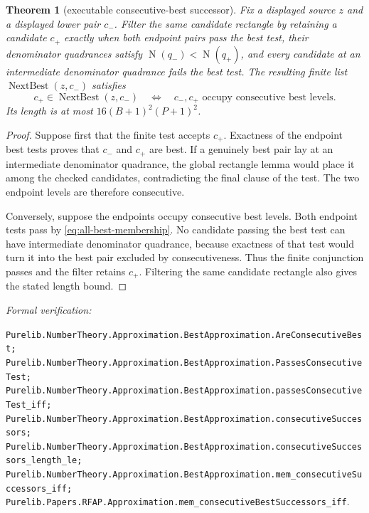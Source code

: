 \documentclass[11pt]{article}
\newtheorem{theorem}{Theorem}[section]
\newcommand{\Norm}[1]{\operatorname{N}\!\left(#1\right)}
\newcommand{\leanref}[1]{\par\smallskip\noindent
  \emph{Formal verification:}\par\nobreak
  {\raggedright\nolinkurl{#1}.\par}}
\begin{document}
\begin{theorem}[executable consecutive-best successor]
\label{thm:consecutive-best-selector}
Fix a displayed source $z$ and a displayed lower pair $c_-$.  Filter the same
candidate rectangle by retaining a candidate $c_+$ exactly when both endpoint
pairs pass the best test, their denominator quadrances satisfy
$\Norm{q_-}<\Norm{q_+}$, and every candidate at an intermediate denominator
quadrance fails the best test.  The resulting finite list
$\operatorname{NextBest}(z,c_-)$ satisfies
\begin{equation}
\label{eq:next-best-selector-membership}
 c_+\in\operatorname{NextBest}(z,c_-)
 \quad\Longleftrightarrow\quad
 c_-,c_+\text{ occupy consecutive best levels}.
\end{equation}
Its length is at most $16(B+1)^2(P+1)^2$.
\end{theorem}

\begin{proof}
Suppose first that the finite test accepts $c_+$.  Exactness of the endpoint
best tests proves that $c_-$ and $c_+$ are best.  If a genuinely best pair
lay at an intermediate denominator quadrance, the global rectangle lemma
would place it among the checked candidates, contradicting the final clause
of the test.  The two endpoint levels are therefore consecutive.

Conversely, suppose the endpoints occupy consecutive best levels.  Both
endpoint tests pass by \eqref{eq:all-best-membership}.  No candidate passing
the best test can have intermediate denominator quadrance, because exactness
of that test would turn it into the best pair excluded by consecutiveness.
Thus the finite conjunction passes and the filter retains $c_+$.  Filtering
the same candidate rectangle also gives the stated length bound.
\end{proof}

\leanref{Purelib.NumberTheory.Approximation.BestApproximation.AreConsecutiveBest;
Purelib.NumberTheory.Approximation.BestApproximation.PassesConsecutiveTest;
Purelib.NumberTheory.Approximation.BestApproximation.passesConsecutiveTest_iff;
Purelib.NumberTheory.Approximation.BestApproximation.consecutiveSuccessors;
Purelib.NumberTheory.Approximation.BestApproximation.consecutiveSuccessors_length_le;
Purelib.NumberTheory.Approximation.BestApproximation.mem_consecutiveSuccessors_iff;
Purelib.Papers.RFAP.Approximation.mem_consecutiveBestSuccessors_iff}
\end{document}
